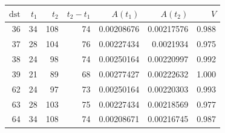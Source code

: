 \begin{tabular}{r r r r r r r}
\toprule
$\mathrm{dst}$ & $t_1$ & $t_2$ & $t_2-t_1$ & $A(t_1)$ & $A(t_2)$ & $V$ \\
\midrule
36 & 34 & 108 & 74 & 0.00208676 & 0.00217576 & 0.988 \\
37 & 28 & 104 & 76 & 0.00227434 & 0.0021934 & 0.975 \\
38 & 24 & 98 & 74 & 0.00250164 & 0.00220997 & 0.992 \\
39 & 21 & 89 & 68 & 0.00277427 & 0.00222632 & 1.000 \\
62 & 24 & 97 & 73 & 0.00250164 & 0.00220303 & 0.993 \\
63 & 28 & 103 & 75 & 0.00227434 & 0.00218569 & 0.977 \\
64 & 34 & 108 & 74 & 0.00208671 & 0.00216745 & 0.987 \\
\bottomrule
\end{tabular}
